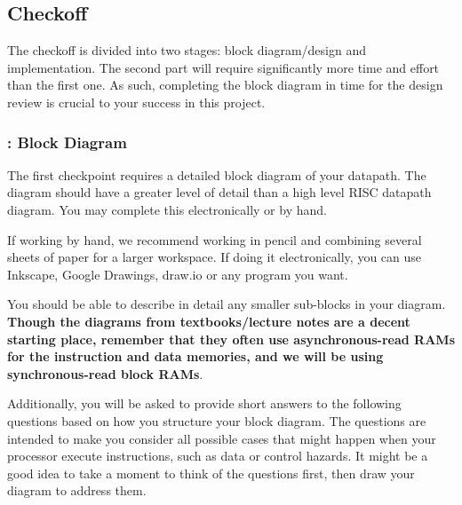 \documentclass[11pt]{article}
\begin{document}
\subsection{Checkoff}
The checkoff is divided into two stages: block diagram/design and implementation.
The second part will require significantly more time and effort than the first one.
As such, completing the block diagram in time for the design review is crucial to your success in this project.

\subsubsection{\blockDiagramTaskName: Block Diagram}
The first checkpoint requires a detailed block diagram of your datapath.
The diagram should have a greater level of detail than a high level RISC datapath diagram.
You may complete this electronically or by hand.

If working by hand, we recommend working in pencil and combining several sheets of paper for a larger workspace.
If doing it electronically, you can use Inkscape, Google Drawings, draw.io or any program you want.

You should be able to describe in detail any smaller sub-blocks in your diagram.
\textbf{Though the diagrams from textbooks/lecture notes are a decent starting place, remember that they often use asynchronous-read RAMs for the instruction and data memories, and we will be using synchronous-read block RAMs}.

Additionally, you will be asked to provide short answers to the following questions based on how you structure your block diagram. The questions are intended to make you consider all possible cases that might happen when your processor execute instructions, such as data or control hazards. It might be a good idea to take a moment to think of the questions first, then draw your diagram to address them.
\end{document}

